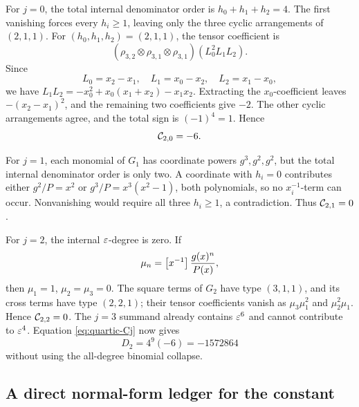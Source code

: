 \documentclass[11pt]{article}
\theoremstyle{definition}
\theoremstyle{remark}
\begin{document}
For \(j=0\), the total internal denominator order is
\(h_0+h_1+h_2=4\).  The first vanishing forces every \(h_i\ge1\), leaving
only the three cyclic arrangements of \((2,1,1)\).  For
\((h_0,h_1,h_2)=(2,1,1)\), the tensor coefficient is
\[
(\rho_{3,2}\otimes\rho_{3,1}\otimes\rho_{3,1})(L_0^2L_1L_2).
\]
Since
\[
L_0=x_2-x_1,
\quad L_1=x_0-x_2,
\quad L_2=x_1-x_0,
\]
we have
\(L_1L_2=-x_0^2+x_0(x_1+x_2)-x_1x_2\).  Extracting the
\(x_0\)-coefficient leaves \(-(x_2-x_1)^2\), and the remaining two
coefficients give \(-2\).  The other cyclic arrangements agree, and the
total sign is \((-1)^4=1\).  Hence
\begin{equation}
\mathcal{C}_{2,0}=-6.
\label{eq:C20}
\end{equation}

For \(j=1\), each monomial of \(G_1\) has coordinate powers
\(g^3,g^2,g^2\), but the total internal denominator order is only two.  A
coordinate with \(h_i=0\) contributes either
\(g^2/P=x^2\) or \(g^3/P=x^3(x^2-1)\), both polynomials, so no
\(x_i^{-1}\)-term can occur.  Nonvanishing would require all three
\(h_i\ge1\), a contradiction.  Thus \(\mathcal{C}_{2,1}=0\).

For \(j=2\), the internal \(\varepsilon\)-degree is zero.  If
\[
\mu_n=\left[x^{-1}\right]\frac{g(x)^n}{P(x)},
\]
then \(\mu_1=1\), \(\mu_2=\mu_3=0\).  The square terms of \(G_2\) have
type \((3,1,1)\), and its cross terms have type \((2,2,1)\); their tensor
coefficients vanish as \(\mu_3\mu_1^2\) and \(\mu_2^2\mu_1\).  Hence
\(\mathcal{C}_{2,2}=0\).  The \(j=3\) summand already contains \(\varepsilon^6\) and
cannot contribute to \(\varepsilon^4\).  Equation \eqref{eq:quartic-Cj} now gives
\begin{equation}
D_2=4^9(-6)=-1572864
\label{eq:D2-direct}
\end{equation}
without using the all-degree binomial collapse.

\subsection{A direct normal-form ledger for the constant}
\label{subsec:quartic-constant}
\end{document}
